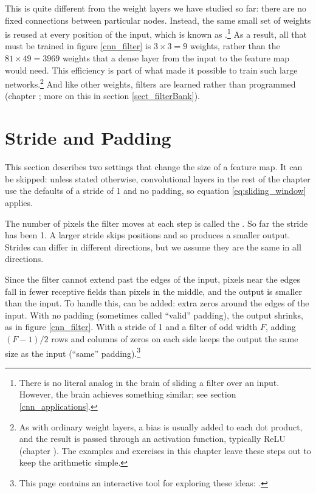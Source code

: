 This is quite different from the weight layers we have studied so far: there are no fixed connections between particular nodes. Instead, the same small set of weights is reused at every position of the input, which is known as .\footnote{There is no literal analog in the brain of sliding a filter over an input. However, the brain achieves something similar; see section \ref{cnn_applications}.} As a result, all that must be trained in figure \ref{cnn_filter} is $3 \times 3 = 9$ weights, rather than the $81 \times 49 = 3969$ weights that a dense layer from the input to the feature map would need. This efficiency is part of what made it possible to train such large networks.\footnote{As with ordinary weight layers, a bias is usually added to each dot product, and the result is passed through an activation function, typically ReLU (chapter ). The examples and exercises in this chapter leave these steps out to keep the arithmetic simple.} And like other weights, filters are learned rather than programmed (chapter ; more on this in section \ref{sect_filterBank}).

\section{Stride and Padding}\label{sect_stride}

This section describes two settings that change the size of a feature map. It can be skipped: unless stated otherwise, convolutional layers in the rest of the chapter use the defaults of a stride of 1 and no padding, so equation \ref{eq:sliding_window} applies.

The number of pixels the filter moves at each step is called the . So far the stride has been 1. A larger stride skips positions and so produces a smaller output. Strides can differ in different directions, but we assume they are the same in all directions.

Since the filter cannot extend past the edges of the input, pixels near the edges fall in fewer receptive fields than pixels in the middle, and the output is smaller than the input. To handle this,  can be added: extra zeros around the edges of the input. With no padding (sometimes called ``valid'' padding), the output shrinks, as in figure \ref{cnn_filter}. With a stride of 1 and a filter of odd width $F$, adding $(F-1)/2$ rows and columns of zeros on each side keeps the output the same size as the input (``same'' padding).\footnote{This page contains an interactive tool for exploring these ideas: .}

